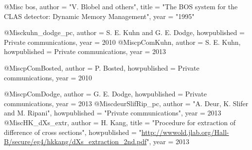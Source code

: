 @Misc{ bos,
  author = "V. Blobel and others",
  title  = "{The BOS system for the CLAS detector: Dynamic Memory Management}",
  year   = "1995"
} 


@Misc{kuhn_dodge_pc,
  author = {S. E. Kuhn and G. E. Dodge},
  howpublished  = {Private communications},
  year = 2010
}
@Misc{pComKuhn,
  author = {S. E. Kuhn},
  howpublished  = {Private communications},
  year = 2013
}

@Misc{pComBosted,
  author = {P. Bosted},
  howpublished  = {Private communications},
  year = 2010
}

@Misc{pComDodge,
  author = {G. E. Dodge},
  howpublished  = {Private communications},
  year = 2013
}
@Misc{deurSlifRip_pc,
  author = "{A. Deur, K. Slifer and M. Ripani}",
  howpublished  = "{Private communications}",
  year = 2013
}
@Misc{HK_dXs_extr,
  author = {H. Kang},
  title  = "Procedure for extraction of difference of cross sections",
  howpublished = "\url{http://wwwold.jlab.org/Hall-B/secure/eg4/hkkang/dXs\_extraction\_2nd.pdf}", 
  year = 2013
}



